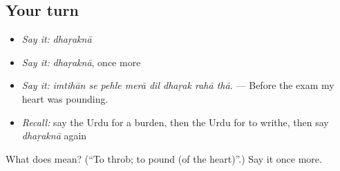 \subsection*{Your turn}
\begin{itemize}
\raggedright
  \item \emph{Say it:} \emph{dhaṛaknā}
  \item \emph{Say it:} \emph{dhaṛaknā}, once more
  \item \emph{Say it:} \emph{imtihān se pehle merā dil dhaṛak rahā thā.} — Before the exam my heart was pounding.
  \item \emph{Recall:} say the Urdu for a burden, then the Urdu for to writhe, then say \emph{dhaṛaknā} again
\end{itemize}

\begin{tcolorbox}[breakable,colback=teal!4,colframe=teal!35!black,title={Before you move on}]
What does  mean? (\textquotedblleft{}To throb; to pound (of the heart)\textquotedblright{}.) Say it once more.
\end{tcolorbox}
